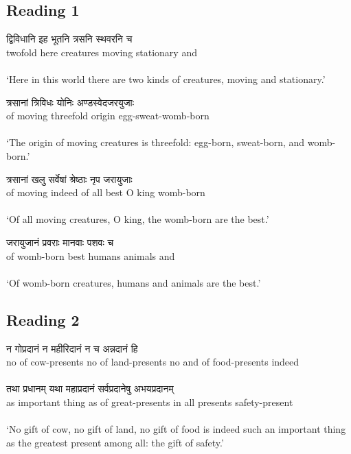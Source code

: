 \subsection*{Reading 1}
\glll
द्विविधानि इह भूतनि त्रसनि स्थवरनि च\\
twofold here creatures moving stationary and\\
{\neut \pl \nom} {\indecl} {\neut \pl \nom} {\neut \pl \nom} {\neut \pl \nom} {\indecl}\\
\glt `Here in this world there are two kinds of creatures, moving and stationary.'

\glll
त्रसानां त्रिविधः योनिः अण्डस्वेदजरयुजाः\\
{of moving} threefold origin egg-sweat-womb-born\\
{\neut \pl \gen} {\masc \sg \nom} {\masc \sg \nom} {\neut \pl \nom} \\
\glt `The origin of moving creatures is threefold: egg-born, sweat-born, and womb-born.'

\glll
त्रसानां खलु सर्वेषां श्रेष्ठाः नृप जरायुजाः\\
{of moving} indeed {of all} best {O king} womb-born\\
{\neut \pl \gen} {\indecl} {\neut \pl \gen} {\masc \pl \nom} {\masc \sg \voc} {\neut \pl \nom}\\
\glt `Of all moving creatures, O king, the womb-born are the best.'

\glll
जरायुजानं प्रवराः मानवाः पशवः च\\
{of womb-born} best humans animals and\\
{\neut \pl \gen} {\masc \pl \nom} {\masc \pl \nom} {\masc \pl \nom} {\indecl}\\
\glt `Of womb-born creatures, humans and animals are the best.'

\subsection*{Reading 2}
\glll
न गोप्रदानं न महीरिदानं न च अन्नदानं हि  \\
no {of cow-presents} no {of land-presents} no and {of food-presents} indeed \\
{\indecl} {\neut \pl \gen} {\indecl} {\neut \pl \gen} {\indecl} {\indecl} {\neut \pl \gen} {\indecl} \\

\glll
तथा प्रधानम् यथा महाप्रदानं सर्वप्रदानेषु अभयप्रदानम्\\
as {important thing} as {of great-presents} {in all presents} safety-present \\
{\indecl} {\neut \sg \nom} {\indecl} {\neut \pl \gen} {\neut \pl \loc} {\neut \sg \nom}\\
\glt `No gift of cow, no gift of land, no gift of food is indeed such an important thing as the greatest present among all: the gift of safety.'
